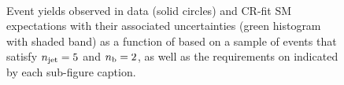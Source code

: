 \begin{figure}[h!]
\begin{center}
    \\
    \caption{Event yields observed in data (solid circles) and CR-fit SM expectations with their associated uncertainties (green histogram with shaded band) as a function of \HTmiss based on a sample of events that satisfy $n_{\text{jet}} = 5$ and $n_{\text{b}} = 2$, as well as the requirements on \scalht indicated by each sub-figure caption. }
    \label{fig:mhtdim_eq5j_eq2b}
  \end{center}
\end{figure}

